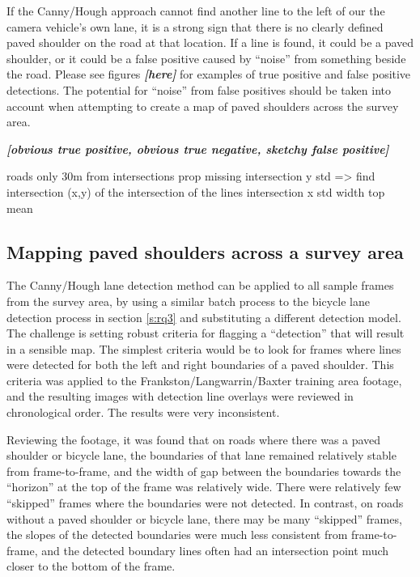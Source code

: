\documentclass[11pt,twoside]{report}
\newcommand{\remark}[1]{{\bf \em [\marginpar{$\Leftarrow$}#1]}}
\begin{document}
If the Canny/Hough approach cannot find another line to the left of our the camera vehicle's own lane, it is a strong sign that there is no clearly defined paved shoulder on the road at that location.  If a line is found, it could be a paved shoulder, or it could be a false positive caused by ``noise'' from something beside the road.  Please see figures \remark{here} for examples of true positive and false positive detections.  The potential for ``noise'' from false positives should be taken into account when attempting to create a map of paved shoulders across the survey area.

\remark{obvious true positive, obvious true negative, sketchy false positive}

roads only
30m from intersections
prop missing
intersection y std => find intersection (x,y) of the intersection of the lines
intersection x std
width top mean

\subsection{Mapping paved shoulders across a survey area}

The Canny/Hough lane detection method can be applied to all sample frames from the survey area, by using a similar batch process to the bicycle lane detection process in section \ref{s:rq3} and substituting a different detection model.  The challenge is setting robust criteria for flagging a ``detection'' that will result in a sensible map.  The simplest criteria would be to look for frames where lines were detected for both the left and right boundaries of a paved shoulder.  This criteria was applied to the Frankston/Langwarrin/Baxter training area footage, and the resulting images with detection line overlays were reviewed in chronological order.  The results were very inconsistent.

Reviewing the footage, it was found that on roads where there was a paved shoulder or bicycle lane, the boundaries of that lane remained relatively stable from frame-to-frame, and the width of gap between the boundaries towards the ``horizon'' at the top of the frame was relatively wide.  There were relatively few ``skipped'' frames where the boundaries were not detected.  In contrast, on roads without a paved shoulder or bicycle lane, there may be many ``skipped'' frames, the slopes of the detected boundaries were much less consistent from frame-to-frame, and the detected boundary lines often had an intersection point much closer to the bottom of the frame.
\end{document}
